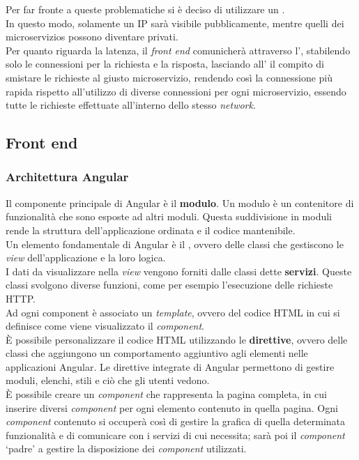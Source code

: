 \noindent Per far fronte a queste problematiche si è deciso di utilizzare un .\\
In questo modo, solamente un \gls{IP} sarà visibile pubblicamente, mentre quelli dei \glspl{microservizio} possono diventare privati.\\
Per quanto riguarda la latenza, il \textit{front end} comunicherà attraverso l', stabilendo solo le connessioni per la richiesta e la risposta, lasciando all' il compito di smistare le richieste al giusto \gls{microservizio}, rendendo così la connessione più rapida rispetto all'utilizzo di diverse connessioni per ogni \gls{microservizio}, essendo tutte le richieste effettuate all'interno dello stesso \textit{network}.

\subsection{Front end}
\subsubsection{Architettura Angular}
Il componente principale di Angular è il \textbf{modulo}. Un modulo è un contenitore di funzionalità che sono esposte ad altri moduli. Questa suddivisione in moduli rende la struttura dell'applicazione ordinata e il codice mantenibile.\\
Un elemento fondamentale di Angular è il , ovvero delle classi che gestiscono le \textit{view} dell'applicazione e la loro logica.\\
I dati da visualizzare nella \textit{view} vengono forniti dalle classi dette \textbf{servizi}. Queste classi svolgono diverse funzioni, come per esempio  l'esecuzione delle richieste HTTP.\\  
Ad ogni component è associato un \textit{template}, ovvero del codice HTML in cui si definisce come viene visualizzato il \textit{component}.\\
È possibile personalizzare il codice HTML utilizzando le \textbf{direttive}, ovvero delle classi che aggiungono un comportamento aggiuntivo agli elementi nelle applicazioni Angular. Le direttive integrate di Angular permettono di gestire moduli, elenchi, stili e ciò che gli utenti vedono.\\
È possibile creare un \textit{component} che rappresenta la pagina completa, in cui inserire diversi \textit{component} per ogni elemento contenuto in quella pagina.
Ogni \textit{component} contenuto si occuperà così di gestire la grafica di quella determinata funzionalità e di comunicare con i servizi di cui necessita; sarà poi il \textit{component} \enquote*{padre} a gestire la disposizione dei \textit{component} utilizzati. 
